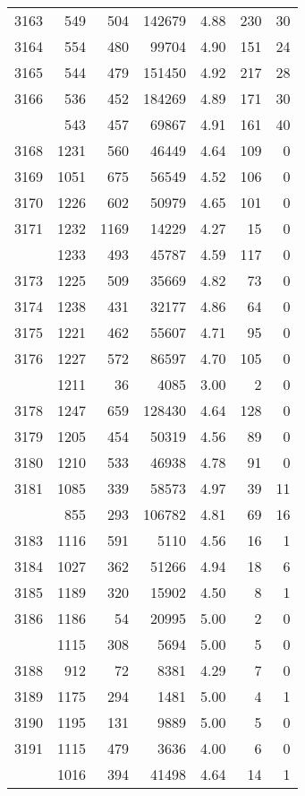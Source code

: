\documentclass[
]{article}
\begin{document}
\begin{table}
\begin{tabular}[t]{lrrrrrr}
3163 & 549 & 504 & 142679 & 4.88 & 230 & 30\\
3164 & 554 & 480 & 99704 & 4.90 & 151 & 24\\
3165 & 544 & 479 & 151450 & 4.92 & 217 & 28\\
3166 & 536 & 452 & 184269 & 4.89 & 171 & 30\\
\addlinespace
3167 & 543 & 457 & 69867 & 4.91 & 161 & 40\\
3168 & 1231 & 560 & 46449 & 4.64 & 109 & 0\\
3169 & 1051 & 675 & 56549 & 4.52 & 106 & 0\\
3170 & 1226 & 602 & 50979 & 4.65 & 101 & 0\\
3171 & 1232 & 1169 & 14229 & 4.27 & 15 & 0\\
\addlinespace
3172 & 1233 & 493 & 45787 & 4.59 & 117 & 0\\
3173 & 1225 & 509 & 35669 & 4.82 & 73 & 0\\
3174 & 1238 & 431 & 32177 & 4.86 & 64 & 0\\
3175 & 1221 & 462 & 55607 & 4.71 & 95 & 0\\
3176 & 1227 & 572 & 86597 & 4.70 & 105 & 0\\
\addlinespace
3177 & 1211 & 36 & 4085 & 3.00 & 2 & 0\\
3178 & 1247 & 659 & 128430 & 4.64 & 128 & 0\\
3179 & 1205 & 454 & 50319 & 4.56 & 89 & 0\\
3180 & 1210 & 533 & 46938 & 4.78 & 91 & 0\\
3181 & 1085 & 339 & 58573 & 4.97 & 39 & 11\\
\addlinespace
3182 & 855 & 293 & 106782 & 4.81 & 69 & 16\\
3183 & 1116 & 591 & 5110 & 4.56 & 16 & 1\\
3184 & 1027 & 362 & 51266 & 4.94 & 18 & 6\\
3185 & 1189 & 320 & 15902 & 4.50 & 8 & 1\\
3186 & 1186 & 54 & 20995 & 5.00 & 2 & 0\\
\addlinespace
3187 & 1115 & 308 & 5694 & 5.00 & 5 & 0\\
3188 & 912 & 72 & 8381 & 4.29 & 7 & 0\\
3189 & 1175 & 294 & 1481 & 5.00 & 4 & 1\\
3190 & 1195 & 131 & 9889 & 5.00 & 5 & 0\\
3191 & 1115 & 479 & 3636 & 4.00 & 6 & 0\\
\addlinespace
3192 & 1016 & 394 & 41498 & 4.64 & 14 & 1\\

\end{tabular}
\end{table}
\end{document}
